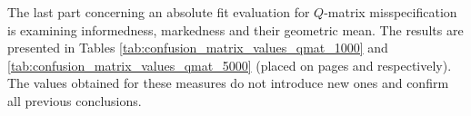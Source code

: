 \documentclass[english]{pwr_wmat_praca_dyplomowa}
\theoremstyle{plain}
\numberwithin{theorem}{chapter}
\theoremstyle{definition}
\numberwithin{theorem}{chapter}
\begin{document}
	The last part concerning an absolute fit evaluation for $Q$-matrix misspecification is examining informedness, markedness and their geometric mean. The results are presented in Tables \ref{tab:confusion_matrix_values_qmat_1000} and \ref{tab:confusion_matrix_values_qmat_5000} (placed on pages \pageref{tab:confusion_matrix_values_qmat_1000} and \pageref{tab:confusion_matrix_values_qmat_5000} respectively). The values obtained for these measures do not introduce new ones and confirm all previous conclusions.
	

	
\end{document}

